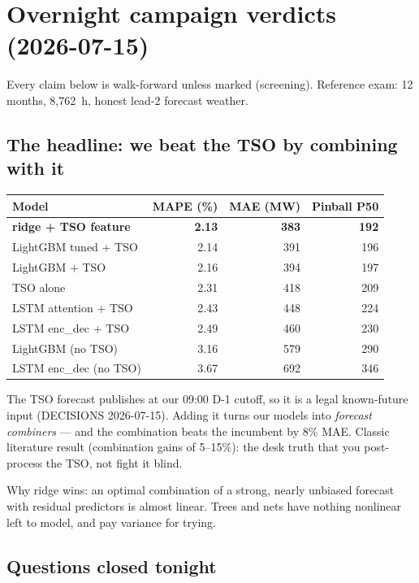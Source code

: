 \section{Overnight campaign verdicts (2026-07-15)}

Every claim below is walk-forward unless marked (screening).
Reference exam: 12 months, 8{,}762~h, honest lead-2 forecast weather.

\subsection{The headline: we beat the TSO by combining with it}

\begin{center}
\begin{tabular}{lrrr}
\toprule
Model & MAPE (\%) & MAE (MW) & Pinball P50 \\
\midrule
\textbf{ridge + TSO feature} & \textbf{2.13} & \textbf{383} & \textbf{192} \\
LightGBM tuned + TSO & 2.14 & 391 & 196 \\
LightGBM + TSO & 2.16 & 394 & 197 \\
TSO alone & 2.31 & 418 & 209 \\
LSTM attention + TSO & 2.43 & 448 & 224 \\
LSTM enc\_dec + TSO & 2.49 & 460 & 230 \\
LightGBM (no TSO) & 3.16 & 579 & 290 \\
LSTM enc\_dec (no TSO) & 3.67 & 692 & 346 \\
\bottomrule
\end{tabular}
\end{center}

The TSO forecast publishes at our 09:00 D-1 cutoff, so it is a legal
known-future input (DECISIONS 2026-07-15). Adding it turns our models into
\emph{forecast combiners} --- and the combination beats the incumbent by 8\%
MAE. Classic literature result (combination gains of 5--15\%): the desk
truth that you post-process the TSO, not fight it blind.

Why ridge wins: an optimal combination of a strong, nearly unbiased
forecast with residual predictors is almost linear. Trees and nets have
nothing nonlinear left to model, and pay variance for trying.

\subsection{Questions closed tonight}

